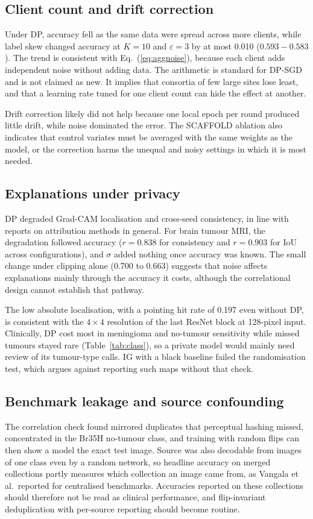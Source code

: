 \documentclass[preprint,12pt]{elsarticle}
\begin{document}
\subsection{Client count and drift correction}
Under DP, accuracy fell as the same data were spread across more clients, while label skew changed accuracy at $K=10$
and $\varepsilon=3$ by at most 0.010 ($0.593-0.583$). The trend is consistent with Eq.~(\ref{eq:aggnoise}), because
each client adds independent noise without adding data. The arithmetic is standard for DP-SGD and is not claimed as new. It
implies that consortia of few large sites lose least, and that a learning rate tuned for one client count can hide
the effect at another.

Drift correction likely did not help because one local epoch per round produced little drift, while noise dominated the
error. The SCAFFOLD ablation also indicates that control variates must be averaged with the same weights as the model,
or the correction harms the unequal and noisy settings in which it is most needed.

\subsection{Explanations under privacy}
DP degraded Grad-CAM localisation and cross-seed consistency, in line with reports on attribution methods in
general.\cite{saifullah2024,manna2024} For brain tumour MRI, the degradation followed accuracy ($r=0.838$ for
consistency and $r=0.903$ for IoU across configurations), and $\sigma$ added nothing once accuracy was known. The
small change under clipping alone (0.700 to 0.663) suggests that noise affects explanations mainly through the
accuracy it costs, although the correlational design cannot establish that pathway.

The low absolute localisation, with a pointing hit rate of 0.197 even without DP, is consistent with the $4\times4$
resolution of the last ResNet block at 128-pixel input. Clinically, DP cost most in meningioma and no-tumour
sensitivity while missed tumours stayed rare (Table~\ref{tab:class}), so a private model would mainly need review of
its tumour-type calls. IG with a black baseline failed the randomisation test, which argues against
reporting such maps without that check.\cite{adebayo2018}

\subsection{Benchmark leakage and source confounding}
The correlation check found mirrored duplicates that perceptual hashing missed, concentrated in the Br35H no-tumour
class, and training with random flips can then show a model the exact test image. Source was also decodable from images
of one class even by a random network, so headline accuracy on merged collections partly measures which collection an
image came from, as Vangala et al.\ reported for centralised benchmarks.\cite{vangala2026} Accuracies reported on these
collections\cite{albalawi2024,mastoi2025,muntaqim2025,paul2026} should therefore not be read as clinical performance,
and flip-invariant deduplication with per-source reporting should become routine.
\end{document}
